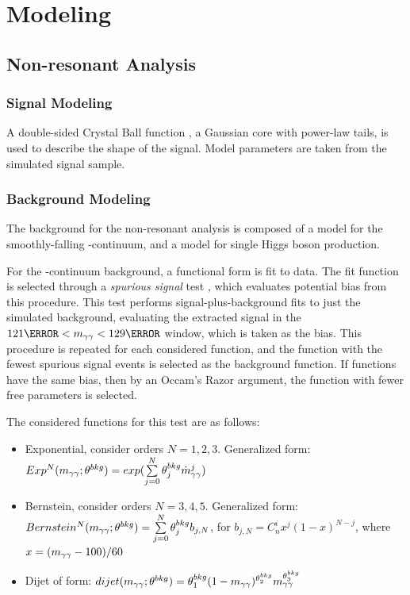 


\section{Modeling}



\subsection{Non-resonant Analysis}
\subsubsection{Signal Modeling}

A double-sided Crystal Ball function \cite{dscb-diphoton}, a Gaussian core with power-law tails, is used to describe the shape of the \hhyybb signal. Model parameters are taken from the simulated signal sample.

\subsubsection{Background Modeling} \label{sssec:nonres-bkg-model}

The background for the non-resonant analysis is composed of a model for the smoothly-falling \yy-continuum, and a model for single Higgs boson production. 


For the \yy-continuum background, a functional form is fit to data. The fit function is selected through a \textit{spurious signal} test \cite{spurious-signal-diphoton}, which evaluates potential bias from this procedure. This test performs signal-plus-background fits to just the simulated background, evaluating the extracted signal in the $\unit{121}{\GeV} < \myy < \unit{129}{\GeV}$ window, which is taken as the bias. This procedure is repeated for each considered function, and the function with the fewest spurious signal events is selected as the background function. If functions have the same bias, then by an Occam's Razor argument, the function with fewer free parameters is selected.

The considered functions for this test are as follows:
\begin{itemize}
  \item Exponential, consider orders $N=1,2,3$. Generalized form: $Exp^N (m_{\gamma\gamma} ; \theta^{bkg}) = exp(\sum\limits_{j=0}^{N} \theta_j^{bkg} \dot m_{\gamma\gamma}^j)$
  \item Bernstein, consider orders $N=3,4,5$. Generalized form: $Bernstein^N (m_{\gamma\gamma} ; \theta^{bkg}) = \sum\limits_{j=0}^{N} \theta_j^{bkg} b_{j,N}$, for $b_{j,N} = C_n^i x^j (1-x)^{N-j}$, where $x= (m_{\gamma\gamma}-100)/60$
  \item Dijet of form: $dijet(m_{\gamma\gamma} ; \theta^{bkg}) = \theta_1^{bkg} (1-m_{\gamma\gamma})^{\theta_2^{bkg}} m_{\gamma\gamma}^{\theta_3^{bkg}}$
\end{itemize}

